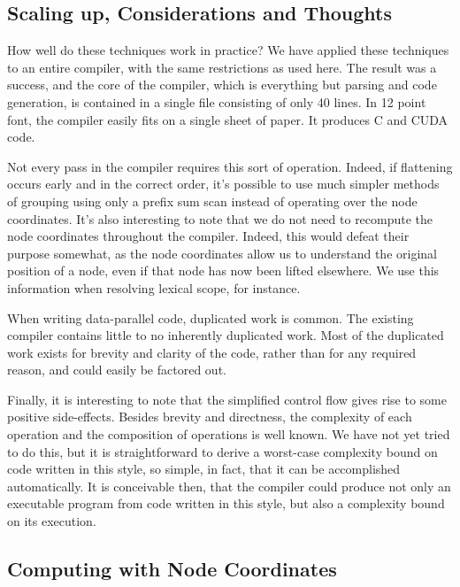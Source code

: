 \documentclass[pldi]{sigplanconf-pldi15}
\begin{document}
\subsection{Scaling up, Considerations and Thoughts}

How well do these techniques work in practice? We have applied these techniques to an entire compiler, 
with the same restrictions as used here. The result was a success, and the core of the compiler, which 
is everything but parsing and code generation, is contained in a single file consisting of only 40 lines. 
In 12 point font, the compiler easily fits on a single sheet of paper. It produces C and CUDA code.

Not every pass in the compiler requires this sort of operation. Indeed, if flattening occurs early and 
in the correct order, it’s possible to use much simpler methods of grouping using only a prefix sum 
scan instead of operating over the node coordinates. It’s also interesting to note that we do not 
need to recompute the node coordinates throughout the compiler. Indeed, this would defeat their 
purpose somewhat, as the node coordinates allow us to understand the original position of a node, 
even if that node has now been lifted elsewhere. We use this information when resolving lexical scope, 
for instance. 

When writing data-parallel code, duplicated work is common. The existing compiler contains little to 
no inherently duplicated work. Most of the duplicated work exists for brevity and clarity of the code, 
rather than for any required reason, and could easily be factored out. 

Finally, it is interesting to note that the simplified control flow gives rise to some positive side-effects. 
Besides brevity and directness, the complexity of each operation and the composition of operations is 
well known. We have not yet tried to do this, but it is straightforward to derive a worst-case complexity 
bound on code written in this style, so simple, in fact, that it can be accomplished automatically. It is 
conceivable then, that the compiler could produce not only an executable program from code written 
in this style, but also a complexity bound on its execution. 
\subsection{Computing with Node Coordinates}
\end{document}
